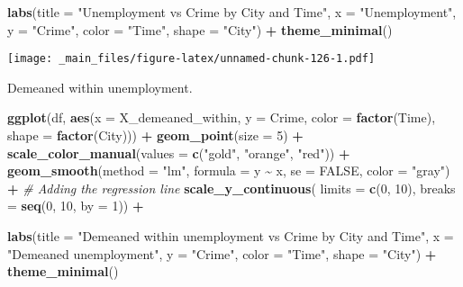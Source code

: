 \documentclass[
]{book}
\newenvironment{Shaded}{\begin{snugshade}}{\end{snugshade}}
\newcommand{\AttributeTok}[1]{\textcolor[rgb]{0.13,0.29,0.53}{#1}}
\newcommand{\CommentTok}[1]{\textcolor[rgb]{0.56,0.35,0.01}{\textit{#1}}}
\newcommand{\ConstantTok}[1]{\textcolor[rgb]{0.56,0.35,0.01}{#1}}
\newcommand{\DecValTok}[1]{\textcolor[rgb]{0.00,0.00,0.81}{#1}}
\newcommand{\FunctionTok}[1]{\textcolor[rgb]{0.13,0.29,0.53}{\textbf{#1}}}
\newcommand{\NormalTok}[1]{#1}
\newcommand{\SpecialCharTok}[1]{\textcolor[rgb]{0.81,0.36,0.00}{\textbf{#1}}}
\newcommand{\StringTok}[1]{\textcolor[rgb]{0.31,0.60,0.02}{#1}}
\begin{document}
\begin{Shaded}
\begin{Highlighting}[]
  \FunctionTok{labs}\NormalTok{(}\AttributeTok{title =} \StringTok{"Unemployment vs Crime by City and Time"}\NormalTok{,}
       \AttributeTok{x =} \StringTok{"Unemployment"}\NormalTok{,}
       \AttributeTok{y =} \StringTok{"Crime"}\NormalTok{,}
       \AttributeTok{color =} \StringTok{"Time"}\NormalTok{,}
       \AttributeTok{shape =} \StringTok{"City"}\NormalTok{) }\SpecialCharTok{+}
  \FunctionTok{theme\_minimal}\NormalTok{()}
\end{Highlighting}
\end{Shaded}

\texttt{[image: \_main\_files/figure-latex/unnamed-chunk-126-1.pdf]}

Demeaned within unemployment.

\begin{Shaded}
\begin{Highlighting}[]
\FunctionTok{ggplot}\NormalTok{(df, }\FunctionTok{aes}\NormalTok{(}\AttributeTok{x =}\NormalTok{ X\_demeaned\_within, }\AttributeTok{y =}\NormalTok{ Crime, }\AttributeTok{color =} \FunctionTok{factor}\NormalTok{(Time), }\AttributeTok{shape =} \FunctionTok{factor}\NormalTok{(City))) }\SpecialCharTok{+}
  \FunctionTok{geom\_point}\NormalTok{(}\AttributeTok{size =} \DecValTok{5}\NormalTok{) }\SpecialCharTok{+}
  \FunctionTok{scale\_color\_manual}\NormalTok{(}\AttributeTok{values =} \FunctionTok{c}\NormalTok{(}\StringTok{"gold"}\NormalTok{, }\StringTok{"orange"}\NormalTok{, }\StringTok{"red"}\NormalTok{)) }\SpecialCharTok{+}
  \FunctionTok{geom\_smooth}\NormalTok{(}\AttributeTok{method =} \StringTok{"lm"}\NormalTok{, }\AttributeTok{formula =}\NormalTok{ y }\SpecialCharTok{\textasciitilde{}}\NormalTok{ x, }\AttributeTok{se =} \ConstantTok{FALSE}\NormalTok{, }\AttributeTok{color =} \StringTok{"gray"}\NormalTok{) }\SpecialCharTok{+}  \CommentTok{\# Adding the regression line}
  \FunctionTok{scale\_y\_continuous}\NormalTok{(}
  \AttributeTok{limits =} \FunctionTok{c}\NormalTok{(}\DecValTok{0}\NormalTok{, }\DecValTok{10}\NormalTok{),}
  \AttributeTok{breaks =} \FunctionTok{seq}\NormalTok{(}\DecValTok{0}\NormalTok{, }\DecValTok{10}\NormalTok{, }\AttributeTok{by =} \DecValTok{1}\NormalTok{)) }\SpecialCharTok{+}
  
  \FunctionTok{labs}\NormalTok{(}\AttributeTok{title =} \StringTok{"Demeaned within unemployment vs Crime by City and Time"}\NormalTok{,}
       \AttributeTok{x =} \StringTok{"Demeaned unemployment"}\NormalTok{,}
       \AttributeTok{y =} \StringTok{"Crime"}\NormalTok{,}
       \AttributeTok{color =} \StringTok{"Time"}\NormalTok{,}
       \AttributeTok{shape =} \StringTok{"City"}\NormalTok{) }\SpecialCharTok{+}
  \FunctionTok{theme\_minimal}\NormalTok{()}
\end{Highlighting}
\end{Shaded}
\end{document}
